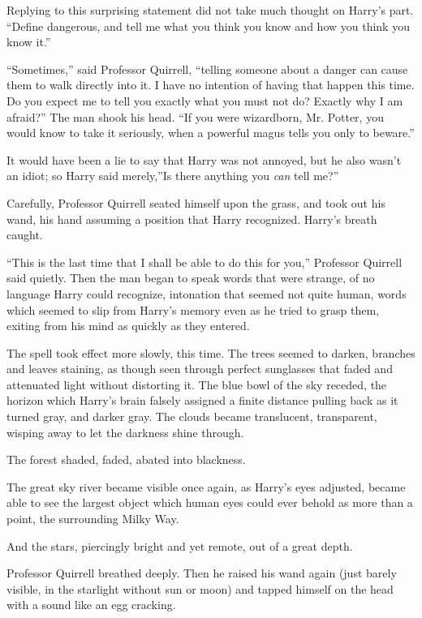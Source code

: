 Replying to this surprising statement did not take much thought on
Harry's part. ``Define dangerous, and tell me what you think you know
and how you think you know it.''

``Sometimes,'' said Professor Quirrell, ``telling someone about a danger
can cause them to walk directly into it. I have no intention of having
that happen this time. Do you expect me to tell you exactly what you
must not do? Exactly why I am afraid?'' The man shook his head. ``If you
were wizardborn, Mr. Potter, you would know to take it seriously, when a
powerful magus tells you only to beware.''

It would have been a lie to say that Harry was not annoyed, but he also
wasn't an idiot; so Harry said merely,''Is there anything you \emph{can}
tell me?''

Carefully, Professor Quirrell seated himself upon the grass, and took
out his wand, his hand assuming a position that Harry recognized.
Harry's breath caught.

``This is the last time that I shall be able to do this for you,''
Professor Quirrell said quietly. Then the man began to speak words that
were strange, of no language Harry could recognize, intonation that
seemed not quite human, words which seemed to slip from Harry's memory
even as he tried to grasp them, exiting from his mind as quickly as they
entered.

The spell took effect more slowly, this time. The trees seemed to
darken, branches and leaves staining, as though seen through perfect
sunglasses that faded and attenuated light without distorting it. The
blue bowl of the sky receded, the horizon which Harry's brain falsely
assigned a finite distance pulling back as it turned gray, and darker
gray. The clouds became translucent, transparent, wisping away to let
the darkness shine through.

The forest shaded, faded, abated into blackness.

The great sky river became visible once again, as Harry's eyes adjusted,
became able to see the largest object which human eyes could ever behold
as more than a point, the surrounding Milky Way.

And the stars, piercingly bright and yet remote, out of a great depth.

Professor Quirrell breathed deeply. Then he raised his wand again (just
barely visible, in the starlight without sun or moon) and tapped himself
on the head with a sound like an egg cracking.


